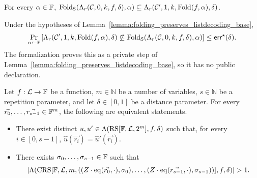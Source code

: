 \begin{lemma}\label{lemma:folding_preserves_listdecoding_bound}
\leanok
{}
    For every $\alpha \in \mathbb{F}$, $\mathrm{Fold_S}(\Lambda_{r}(\mathcal{C}, 0, k, f, \delta), \alpha) \subseteq \Lambda_{r}(\mathcal{C}', 1, k, \mathrm{Fold}(f, \alpha), \delta)$.
\end{lemma}

\begin{lemma}\label{lemma:folding_preserves_listdecoding_base_ne_subset}
    Under the hypotheses of Lemma~\ref{lemma:folding_preserves_listdecoding_base},
    \[
    \Pr_{\alpha \leftarrow \mathbb{F}} \left[
    \Lambda_{r}(\mathcal{C}', 1, k, \mathrm{Fold}(f, \alpha), \delta)
    \not\subseteq \mathrm{Fold_S}(\Lambda_{r}(\mathcal{C}, 0, k, f, \delta), \alpha)
    \right] \le \mathsf{err}^\star(\delta).
    \]
    The formalization proves this as a private step of
    Lemma~\ref{lemma:folding_preserves_listdecoding_base}, so it has no public declaration.
\end{lemma}

\begin{lemma}\label{lemma:crs_equiv_rs_randpompt_agreement}
    Let $f : \mathcal{L} \rightarrow \mathbb{F}$ be a function, $m \in \mathbb{N}$ be a number of variables, $s \in \mathbb{N}$ be a repetition parameter, and let $\delta \in [0,1]$ be a distance parameter. For every $\vec{r_0}, \dots, \vec{r_{s-1}} \in \mathbb{F}^m$, the following are equivalent statements.
\begin{itemize}
    \item There exist distinct $u, u' \in \Lambda(\mathrm{RS}[\mathbb{F}, \mathcal{L}, 2^m], f, \delta)$ such that, for every $i \in [0,s-1]$, $\hat{u}(\vec{r_i}) = \hat{u}'(\vec{r_i})$.
    \item There exists $\sigma_0, \dots, \sigma_{s-1} \in \mathbb{F}$ such that $$\left| \Lambda(\mathrm{CRS}[\mathbb{F}, \mathcal{L}, m, ((Z \cdot \mathrm{eq}(\vec{r_0}, \cdot), \sigma_0), \dots, (Z \cdot \mathrm{eq}(\vec{r_{s-1}}, \cdot), \sigma_{s-1}))], f, \delta) \right| > 1.$$
\end{itemize}
\end{lemma}

